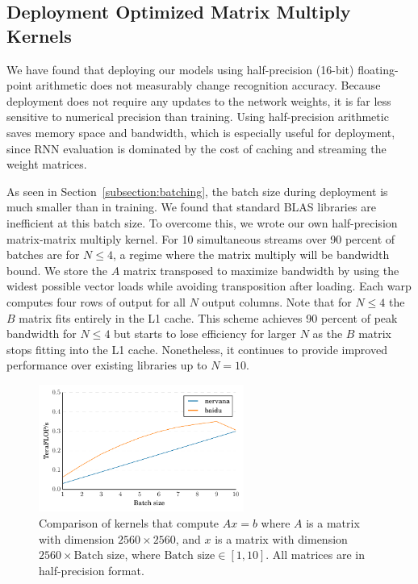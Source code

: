 \documentclass{article}
\begin{document}
\subsection{Deployment Optimized Matrix Multiply Kernels}
We have found that deploying our models using half-precision (16-bit) floating-point arithmetic does not measurably change recognition accuracy. Because deployment does not require any updates to the network weights, it is far less sensitive to numerical precision than training. Using half-precision arithmetic saves memory space and bandwidth, which is especially useful for deployment, since RNN evaluation is dominated by the cost of caching and streaming the weight matrices.

As seen in Section~\ref{subsection:batching}, the batch size during deployment is much smaller than in training. We found that standard BLAS libraries are inefficient at this batch size. To overcome this, we wrote our own half-precision matrix-matrix multiply kernel. For 10 simultaneous streams over 90 percent of batches are for $N \leq 4$, a regime where the matrix multiply will be bandwidth bound.  We store the $A$ matrix transposed to maximize bandwidth by using the widest possible vector loads while avoiding transposition after loading.  Each warp computes four rows of output for all $N$ output columns.  Note that for $N \leq 4$ the $B$ matrix fits entirely in the L1 cache.  This scheme achieves 90 percent of peak bandwidth for $N \leq 4$ but starts to lose efficiency for larger $N$ as the $B$ matrix stops fitting into the L1 cache.  Nonetheless, it continues to provide improved performance over existing libraries up to $N=10$.

\begin{figure}
\centering
\includegraphics[width=0.6\textwidth]{HGEMM}
\caption{Comparison of kernels that compute $A x = b$ where $A$ is a matrix with dimension $2560 \times 2560$, and $x$ is a matrix with dimension $2560 \times \textrm{Batch size}$, where $\textrm{Batch size} \in [1, 10]$. All matrices are in half-precision format.}
\label{fig:HGEMM}
\end{figure}
\end{document}
